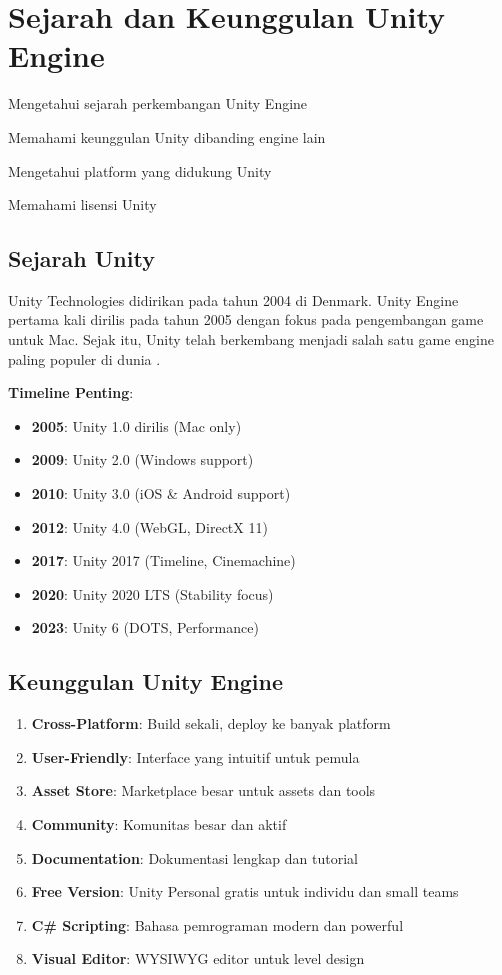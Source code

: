 \section{Sejarah dan Keunggulan Unity Engine}

\begin{learningoutcomes}
\item Mengetahui sejarah perkembangan Unity Engine
\item Memahami keunggulan Unity dibanding engine lain
\item Mengetahui platform yang didukung Unity
\item Memahami lisensi Unity
\end{learningoutcomes}

\subsection{Sejarah Unity}

Unity Technologies didirikan pada tahun 2004 di Denmark. Unity Engine pertama kali dirilis pada tahun 2005 dengan fokus pada pengembangan game untuk Mac. Sejak itu, Unity telah berkembang menjadi salah satu game engine paling populer di dunia \cite{UnityManual2024}.

\textbf{Timeline Penting}:
\begin{itemize}
    \item \textbf{2005}: Unity 1.0 dirilis (Mac only)
    \item \textbf{2009}: Unity 2.0 (Windows support)
    \item \textbf{2010}: Unity 3.0 (iOS \& Android support)
    \item \textbf{2012}: Unity 4.0 (WebGL, DirectX 11)
    \item \textbf{2017}: Unity 2017 (Timeline, Cinemachine)
    \item \textbf{2020}: Unity 2020 LTS (Stability focus)
    \item \textbf{2023}: Unity 6 (DOTS, Performance)
\end{itemize}

\subsection{Keunggulan Unity Engine}

\begin{enumerate}
\item \textbf{Cross-Platform}: Build sekali, deploy ke banyak platform
\item \textbf{User-Friendly}: Interface yang intuitif untuk pemula
\item \textbf{Asset Store}: Marketplace besar untuk assets dan tools
\item \textbf{Community}: Komunitas besar dan aktif
\item \textbf{Documentation}: Dokumentasi lengkap dan tutorial
\item \textbf{Free Version}: Unity Personal gratis untuk individu dan small teams
\item \textbf{C\# Scripting}: Bahasa pemrograman modern dan powerful
\item \textbf{Visual Editor}: WYSIWYG editor untuk level design
\end{enumerate}

